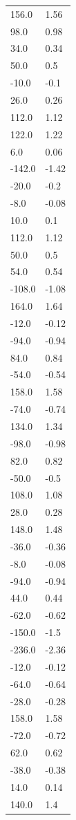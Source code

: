 \begin{longtable}{ll}
156.0 & 1.56 \\
98.0 & 0.98 \\
34.0 & 0.34 \\
50.0 & 0.5 \\
-10.0 & -0.1 \\
26.0 & 0.26 \\
112.0 & 1.12 \\
122.0 & 1.22 \\
6.0 & 0.06 \\
-142.0 & -1.42 \\
-20.0 & -0.2 \\
-8.0 & -0.08 \\
10.0 & 0.1 \\
112.0 & 1.12 \\
50.0 & 0.5 \\
54.0 & 0.54 \\
-108.0 & -1.08 \\
164.0 & 1.64 \\
-12.0 & -0.12 \\
-94.0 & -0.94 \\
84.0 & 0.84 \\
-54.0 & -0.54 \\
158.0 & 1.58 \\
-74.0 & -0.74 \\
134.0 & 1.34 \\
-98.0 & -0.98 \\
82.0 & 0.82 \\
-50.0 & -0.5 \\
108.0 & 1.08 \\
28.0 & 0.28 \\
148.0 & 1.48 \\
-36.0 & -0.36 \\
-8.0 & -0.08 \\
-94.0 & -0.94 \\
44.0 & 0.44 \\
-62.0 & -0.62 \\
-150.0 & -1.5 \\
-236.0 & -2.36 \\
-12.0 & -0.12 \\
-64.0 & -0.64 \\
-28.0 & -0.28 \\
158.0 & 1.58 \\
-72.0 & -0.72 \\
62.0 & 0.62 \\
-38.0 & -0.38 \\
14.0 & 0.14 \\
140.0 & 1.4 \\

\end{longtable}
